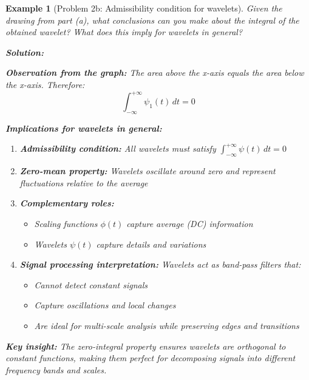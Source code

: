 \documentclass[11pt,a4paper]{article}
\newtheorem{example}[theorem]{Example}
\begin{document}
\begin{example}[Problem 2b: Admissibility condition for wavelets]
   Given the drawing from part (a), what conclusions can you make about the integral of the obtained wavelet? What does this imply for wavelets in general?
   
   \textbf{Solution:}
   
   \textbf{Observation from the graph:} The area above the x-axis equals the area below the x-axis. Therefore:
   $$\int_{-\infty}^{+\infty} \psi_1(t)\,dt = 0$$
   
   \textbf{Implications for wavelets in general:}
   \begin{enumerate}
       \item \textbf{Admissibility condition:} All wavelets must satisfy $\int_{-\infty}^{+\infty} \psi(t)\,dt = 0$
       
       \item \textbf{Zero-mean property:} Wavelets oscillate around zero and represent fluctuations relative to the average
       
       \item \textbf{Complementary roles:}
       \begin{itemize}
           \item Scaling functions $\phi(t)$ capture average (DC) information
           \item Wavelets $\psi(t)$ capture details and variations
       \end{itemize}
       
       \item \textbf{Signal processing interpretation:} Wavelets act as band-pass filters that:
       \begin{itemize}
           \item Cannot detect constant signals
           \item Capture oscillations and local changes
           \item Are ideal for multi-scale analysis while preserving edges and transitions
       \end{itemize}
   \end{enumerate}
   
   \textbf{Key insight:} The zero-integral property ensures wavelets are orthogonal to constant functions, making them perfect for decomposing signals into different frequency bands and scales.
\end{example}
\end{document}
